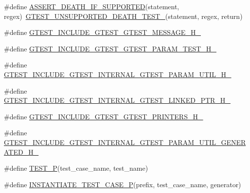 \begin{DoxyCompactItemize}
\item 
\#define \hyperlink{fused-src_2gtest_2gtest_8h_ab2f0f25b46353767179a49ebd15b7345}{\-A\-S\-S\-E\-R\-T\-\_\-\-D\-E\-A\-T\-H\-\_\-\-I\-F\-\_\-\-S\-U\-P\-P\-O\-R\-T\-E\-D}(statement, regex)~\hyperlink{gtest-death-test-internal_8h_a29a145cda8bd2d0c6a78b0ac1d670d18}{\-G\-T\-E\-S\-T\-\_\-\-U\-N\-S\-U\-P\-P\-O\-R\-T\-E\-D\-\_\-\-D\-E\-A\-T\-H\-\_\-\-T\-E\-S\-T\-\_\-}(statement, regex, return)
\item 
\#define \hyperlink{fused-src_2gtest_2gtest_8h_a5c2d86823d7f9ffac3e3766da17091dd}{\-G\-T\-E\-S\-T\-\_\-\-I\-N\-C\-L\-U\-D\-E\-\_\-\-G\-T\-E\-S\-T\-\_\-\-G\-T\-E\-S\-T\-\_\-\-M\-E\-S\-S\-A\-G\-E\-\_\-\-H\-\_\-}
\item 
\#define \hyperlink{fused-src_2gtest_2gtest_8h_a15b9e83e56cafef0ddd12e2444772908}{\-G\-T\-E\-S\-T\-\_\-\-I\-N\-C\-L\-U\-D\-E\-\_\-\-G\-T\-E\-S\-T\-\_\-\-G\-T\-E\-S\-T\-\_\-\-P\-A\-R\-A\-M\-\_\-\-T\-E\-S\-T\-\_\-\-H\-\_\-}
\item 
\#define \hyperlink{fused-src_2gtest_2gtest_8h_a83cf5c299fc04d9f8e555cb42a97aa47}{\-G\-T\-E\-S\-T\-\_\-\-I\-N\-C\-L\-U\-D\-E\-\_\-\-G\-T\-E\-S\-T\-\_\-\-I\-N\-T\-E\-R\-N\-A\-L\-\_\-\-G\-T\-E\-S\-T\-\_\-\-P\-A\-R\-A\-M\-\_\-\-U\-T\-I\-L\-\_\-\-H\-\_\-}
\item 
\#define \hyperlink{fused-src_2gtest_2gtest_8h_af3b61eb2eed4f1fdc94ed2e181fa8483}{\-G\-T\-E\-S\-T\-\_\-\-I\-N\-C\-L\-U\-D\-E\-\_\-\-G\-T\-E\-S\-T\-\_\-\-I\-N\-T\-E\-R\-N\-A\-L\-\_\-\-G\-T\-E\-S\-T\-\_\-\-L\-I\-N\-K\-E\-D\-\_\-\-P\-T\-R\-\_\-\-H\-\_\-}
\item 
\#define \hyperlink{fused-src_2gtest_2gtest_8h_a146e4a81159ecfdc33030e147a024346}{\-G\-T\-E\-S\-T\-\_\-\-I\-N\-C\-L\-U\-D\-E\-\_\-\-G\-T\-E\-S\-T\-\_\-\-G\-T\-E\-S\-T\-\_\-\-P\-R\-I\-N\-T\-E\-R\-S\-\_\-\-H\-\_\-}
\item 
\#define \hyperlink{fused-src_2gtest_2gtest_8h_a34b82ce6255f2f5666647d35498f4c65}{\-G\-T\-E\-S\-T\-\_\-\-I\-N\-C\-L\-U\-D\-E\-\_\-\-G\-T\-E\-S\-T\-\_\-\-I\-N\-T\-E\-R\-N\-A\-L\-\_\-\-G\-T\-E\-S\-T\-\_\-\-P\-A\-R\-A\-M\-\_\-\-U\-T\-I\-L\-\_\-\-G\-E\-N\-E\-R\-A\-T\-E\-D\-\_\-\-H\-\_\-}
\item 
\#define \hyperlink{fused-src_2gtest_2gtest_8h_abd3bb216dafbffa36044a6030216ecda}{\-T\-E\-S\-T\-\_\-\-P}(test\-\_\-case\-\_\-name, test\-\_\-name)
\item 
\#define \hyperlink{fused-src_2gtest_2gtest_8h_ae54c460d07e5e2020484a83764d5111b}{\-I\-N\-S\-T\-A\-N\-T\-I\-A\-T\-E\-\_\-\-T\-E\-S\-T\-\_\-\-C\-A\-S\-E\-\_\-\-P}(prefix, test\-\_\-case\-\_\-name, generator)
\item 

\end{DoxyCompactItemize}
